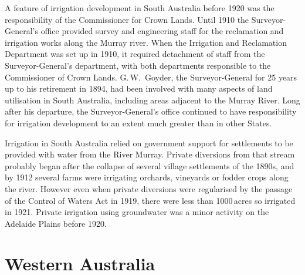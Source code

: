 A feature of irrigation development in South Australia before 1920 was
the responsibility of the Commissioner for Crown Lands.  Until 1910
the Surveyor-General's office provided survey and engineering staff
for the reclamation and irrigation works along the Murray river.  When
the Irrigation and Reclamation Department was set up in 1910, it
required detachment of staff from the Surveyor-General's department,
with both departments responsible to the Commissioner of Crown Lands.
G.\,W.~Goyder,  the Surveyor-General for 25
years up to his retirement in 1894, had been involved with many
aspects of land utilisation in South Australia, including areas
adjacent to the Murray River.  Long after his departure, the
Surveyor-General's office continued to have responsibility for
irrigation development to an extent much greater than in other States.

Irrigation in South Australia relied on government support for
settlements to be provided with water from the River Murray.  Private
diversions from that stream probably began after the collapse of
several village settlements of the 1890s, and by 1912 several farms
were irrigating orchards, vineyards or fodder crops
along the river.  However even when private diversions were
regularised by the passage of the Control of Waters Act in 1919,
 there were less than
1000\,acres so irrigated in 1921. Private irrigation using groundwater
was a minor activity on the Adelaide Plains before
1920.

\section*{Western Australia}


